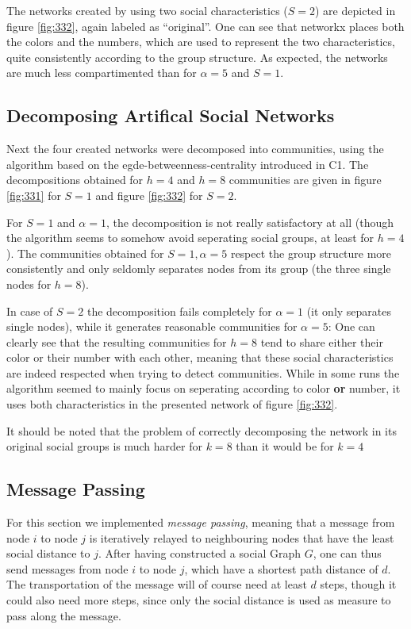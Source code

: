 \documentclass{scrartcl}
\begin{document}
The networks created by using two social characteristics ($S = 2$) are
depicted in figure \ref{fig:332}, again labeled as \enquote{original}. One
can see that networkx places both the colors and the numbers, which are
used to represent the two characteristics, quite consistently according to
the group structure. As expected, the networks are much less compartimented
than for $\alpha = 5$ and $S= 1$.

\subsection{Decomposing Artifical Social Networks}
Next the four created networks were decomposed into communities, using the
algorithm based on the egde-betweenness-centrality introduced in C1.
The decompositions obtained for $h = 4$ and $h = 8$ communities are given
in figure \ref{fig:331} for $S = 1$ and figure \ref{fig:332}  for $S = 2$.

For $S = 1$ and $\alpha = 1$, the decomposition is not really satisfactory
at all (though the algorithm seems to somehow avoid seperating social
groups, at least for $h = 4$).
The communities obtained for $S=1, \alpha = 5$ respect the group structure
more consistently and only seldomly separates nodes from its group (the
three single nodes for $h = 8$).

In case of $S=2$ the decomposition fails completely for $\alpha = 1$ (it
only separates single nodes), while it generates reasonable communities for
$\alpha = 5$: One can clearly see that the resulting communities for $h
= 8$ tend to share either their color or their number with each other, meaning that
these social characteristics are indeed respected when trying to detect
communities.  While in some runs the algorithm seemed to mainly focus on
seperating according to color \textbf{or} number, it uses both
characteristics in the presented network of figure \ref{fig:332}.

It should be noted that the problem of correctly decomposing the network in
its original social groups is much harder for $k = 8$ than it would be for
$k = 4$

\subsection{Message Passing}
For this section we implemented \emph{message passing}, meaning that
a message from node $i$ to node $j$ is iteratively relayed to neighbouring
nodes that have the least social distance to $j$. 
After having constructed a social Graph $G$, one can thus send messages
from node $i$ to node $j$, which have a shortest path distance of $d$.  The
transportation of the message will of course need at least $d$ steps,
though it could also need more steps, since only the social distance is
used as measure to pass along the message.
\end{document}
